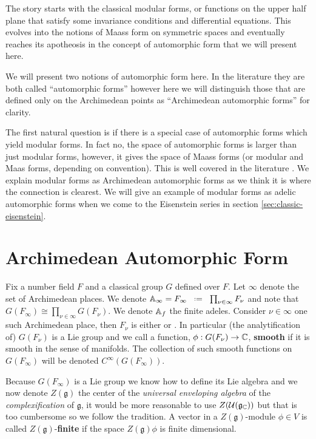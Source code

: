 
The story starts with the classical modular forms, or functions on the upper half plane that satisfy some invariance conditions and differential equations. This evolves into the notions of Maass form on symmetric spaces and eventually reaches its apotheosis in the concept of automorphic form that we will present here. 

We will present two notions of automorphic form here. In the literature they are both called ``automorphic forms'' however here we will distinguish those that are defined only on the Archimedean points as ``Archimedean automorphic forms'' for clarity.

The first natural question is if there is a special case of automorphic forms which yield modular forms. In fact no, the space of automorphic forms is larger than just modular forms, however, it gives the space of Maass forms (or modular and Maas forms, depending on convention). This is well covered in the literature \cite{emertonCLASSICALMODULARFORMS}\cite[3.2]{bumpAutomorphicFormsRepresentations1997}\cite{booherVIEWINGMODULARFORMS}\cite{garrettTransitionEisensteinSeries2016}. We explain modular forms as Archimedean automorphic forms as we think it is where the connection is clearest. We will give an example of modular forms as adelic automorphic forms when we come to the Eisenstein series in section \ref{sec:classic-eisenstein}.




\section{Archimedean Automorphic Form}
Fix a number field \(F\) and a classical group \(G\) defined over \(F\). Let \(\infty\) denote the set of Archimedean places. We denote \(\A_\infty = F_\infty \defeq \prod_{\nu\in\infty} F_\nu\) and note that \(G(F_\infty) \cong \prod_{\nu\in\infty}G(F_\nu)\). We denote \(\A_f\) the finite adeles. Consider \(\nu\in \infty\) one such Archimedean place, then \(F_\nu\) is either \R or \C. In particular (the analytification of) \(G(F_\nu)\) is a Lie group and we call a function, \(\phi: G(F_\nu) \to \C\), \textbf{smooth}  if it is smooth in the sense of manifolds. The collection of such smooth functions on \(G(F_\infty)\) will be denoted \(C^\infty(G(F_\infty))\).

    Because \(G(F_\infty)\) is a Lie group we know how to define its Lie algebra and we now denote \(Z(\mathfrak{g})\) the center of the \textit{universal enveloping algebra} of the \textit{complexification} of \(\mathfrak{g}\), it would be more reasonable to use \(Z(\mathcal{U}(\mathfrak{g}_{\C}))\) but that is too cumbersome so we follow the tradition. 
    A vector in a \(Z(\mathfrak{g})\)-module \(\phi\in V\) is called \(Z(\mathfrak{g})\)-\textbf{finite} if the space \(Z(\mathfrak{g})\phi\) is finite dimensional. 

